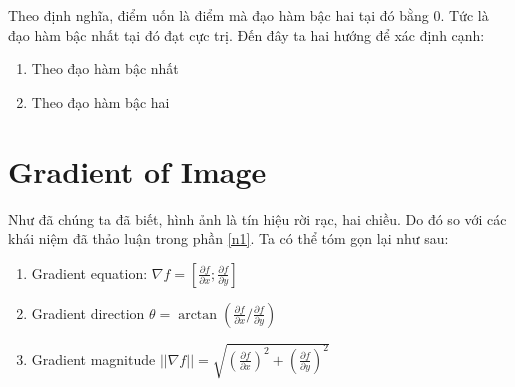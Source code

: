 \documentclass{article}
\begin{document}
Theo định nghĩa, điểm uốn là điểm mà đạo hàm bậc hai tại đó bằng 0. Tức là đạo hàm bậc nhất tại đó đạt cực trị. Đến đây ta hai hướng để xác định cạnh:
\begin{enumerate}
    \item Theo đạo hàm bậc nhất
    \item Theo đạo hàm bậc hai
\end{enumerate}
\section{Gradient of Image}
Như đã chúng ta đã biết, hình ảnh là tín hiệu rời rạc, hai chiều. Do đó so với các khái niệm đã thảo luận trong phần \ref{n1}. Ta có thể tóm gọn lại như sau:
\begin{enumerate}
    \item Gradient equation: $\nabla f= [\frac{\partial f}{\partial x}; \frac{\partial f}{\partial y}]$
    \item Gradient direction $\theta = \arctan{\left(\frac{\partial f}{\partial x}/ \frac{\partial f}{\partial y} \right)}$
    \item Gradient magnitude $||\nabla f|| = \sqrt{\left(\frac{\partial f}{\partial x}\right)^{2}+ \left(\frac{\partial f}{\partial y}\right)^{2}}$
\end{enumerate}
\end{document}
